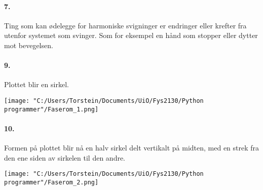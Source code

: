 \documentclass[11pt, A4paper,norsk]{article}
\begin{document}
		\paragraph{7.}
			\begin{flushleft}
Ting som kan ødelegge for harmoniske svigninger er endringer eller krefter fra utenfor systemet som svinger. Som for eksempel en hånd som stopper eller dytter mot bevegelsen.
			\end{flushleft}










		\paragraph{9.}
			\begin{flushleft}
Plottet blir en sirkel.
			\end{flushleft}
\texttt{[image: "C:/Users/Torstein/Documents/UiO/Fys2130/Python programmer"/Faserom\_1.png]}









		\paragraph{10.}
			\begin{flushleft}
Formen på plottet blir nå en halv sirkel delt vertikalt på midten, med en strek fra den ene siden av sirkelen til den andre.
			\end{flushleft}
\texttt{[image: "C:/Users/Torstein/Documents/UiO/Fys2130/Python programmer"/Faserom\_2.png]}
\end{document}
